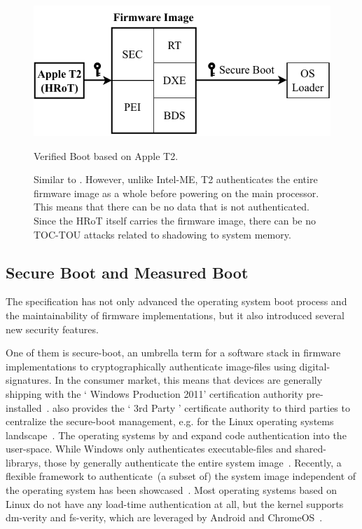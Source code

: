 \begin{figure}[htb]
  \centering
  \includegraphics{Figures/T2RoT.pdf}
  \caption{Verified Boot based on Apple T2.}
  \label{fig:t2_boot}
  \caption*{Similar to . However, unlike \gls{Intel-ME},  T2 authenticates the entire \gls{firmware} image as a whole before powering on the main processor. This means that there can be no data that is not authenticated. Since the \gls{HRoT} itself carries the \gls{firmware} image, there can be no \gls{TOC-TOU} attacks related to shadowing to system memory.}
\end{figure}

\subsection{Secure Boot and Measured Boot}
\label{sec:sb_mb}

The  specification has not only advanced the operating system boot process and the maintainability of \gls{firmware} implementations, but it also introduced several new security features.

One of them is \gls{secure-boot}, an umbrella term for a software stack in  \gls{firmware} implementations to cryptographically authenticate \glspl{image-file} using \glspl{digital-signature}. In the consumer market, this means that devices are generally shipping with the ` Windows Production  2011' certification authority pre-installed~\cite{ms-sbkey}.  also provides the ` 3rd Party  ' certificate authority to third parties to centralize the \gls{secure-boot} management, e.g. for the Linux operating systems landscape~\cite{ms-sbkey3rd}. The operating systems by  and  expand code authentication into the \gls{user-space}. While Windows only authenticates \glspl{executable-file} and \glspl{shared-library}, those by  generally authenticate the entire system image~\cite{apple-sec}. Recently, a flexible framework to authenticate~(a subset of) the system image independent of the operating system has been showcased~\cite{amaranth}. Most operating systems based on Linux do not have any load-time authentication at all, but the kernel supports dm-verity and fs-verity, which are leveraged by Android and ChromeOS~\cite{linux}.

